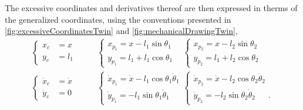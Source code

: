 %
The excessive coordinates and derivatives thereof are then expressed in therms of the generalized coordinates, using the conventions presented in \autoref{fig:excessiveCoordinatesTwin} and \ref{fig:mechanicalDrawingTwin},
\begin{align}
  \begin{cases}
    x_c &=  x  \\
    y_c &=  l_1  
  \end{cases} &
  \hspace{20pt}
  \begin{cases}
    x_{p_1} =  x   - l_1 \sin \theta_1 \\
    y_{p_1} =  l_1 + l_1 \cos \theta_1
  \end{cases}
  \hspace{10pt}
  \begin{cases}
    x_{p_2} =  x   - l_2 \sin \theta_2 \\
    y_{p_2} =  l_1 + l_2 \cos \theta_2
  \end{cases}
  \label{eq:excessiveToGeneralized} \\
  \begin{cases}
    \dot{x}_c &=  \dot{x}  \\
    \dot{y}_c &=  0  
  \end{cases} &
  \hspace{20pt}
  \begin{cases}
    \dot{x}_{p_1} =  \dot{x} - l_1 \cos \theta_1 \dot{\theta}_1 \\
    \dot{y}_{p_1} =  -l_1 \sin \theta_1 \dot{\theta}_1
  \end{cases}
  \begin{cases}
    \dot{x}_{p_2} = \dot{x} - l_2 \cos \theta_2 \dot{\theta}_2 \\
    \dot{y}_{p_2} = -l_2 \sin \theta_2 \dot{\theta}_2 \ \ \ \ \ \ \ .
  \end{cases}
  \label{eq:excessiveToGeneralizedDerivatives}
\end{align}

